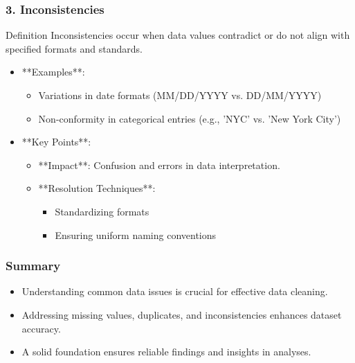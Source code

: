 \documentclass[aspectratio=169]{beamer}
\begin{document}
\begin{frame}[fragile]
    \frametitle{3. Inconsistencies}
    \begin{block}{Definition}
        Inconsistencies occur when data values contradict or do not align with specified formats and standards.
    \end{block}
    
    \begin{itemize}
        \item **Examples**:
        \begin{itemize}
            \item Variations in date formats (MM/DD/YYYY vs. DD/MM/YYYY)
            \item Non-conformity in categorical entries (e.g., 'NYC' vs. 'New York City')
        \end{itemize}
        
        \item **Key Points**:
        \begin{itemize}
            \item **Impact**: Confusion and errors in data interpretation.
            \item **Resolution Techniques**:
            \begin{itemize}
                \item Standardizing formats
                \item Ensuring uniform naming conventions
            \end{itemize}
        \end{itemize}
    \end{itemize}
\end{frame}

\begin{frame}[fragile]
    \frametitle{Summary}
    \begin{itemize}
        \item Understanding common data issues is crucial for effective data cleaning.
        \item Addressing missing values, duplicates, and inconsistencies enhances dataset accuracy.
        \item A solid foundation ensures reliable findings and insights in analyses.
    \end{itemize}
\end{frame}
\end{document}
